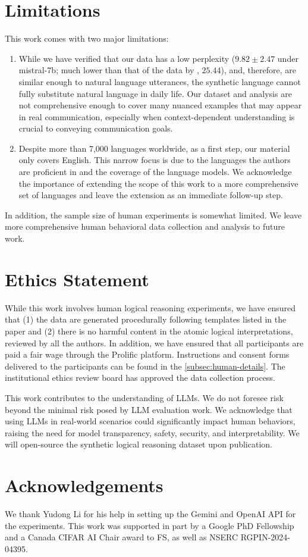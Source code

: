 \section*{Limitations}
This work comes with two major limitations:
\begin{enumerate}[leftmargin=*,topsep=0pt,itemsep=0pt]
      \item While we have verified that our data has a low perplexity ($9.82\pm 2.47$ under mistral-7b; much lower than that of the data by \citet{wanLogicAskerEvaluatingImproving2024}, $25.44$), and, therefore, are similar enough to natural language utterances, the synthetic language cannot fully substitute natural language in daily life.
            Our dataset and analysis are not comprehensive enough to cover many nuanced examples that may appear in real communication, especially when context-dependent understanding is crucial to conveying communication goals.
      \item Despite more than 7,000 languages worldwide, as a first step, our material only covers English.
            This narrow focus is due to the languages the authors are proficient in and the coverage of the language models.
            We acknowledge the importance of extending the scope of this work to a more comprehensive set of languages and leave the extension as an immediate follow-up step.
\end{enumerate}

In addition, the sample size of human experiments is somewhat limited.
We leave more comprehensive human behavioral data collection and analysis to future work.

\section*{Ethics Statement}

While this work involves human logical reasoning experiments, we have ensured that (1) the data are generated procedurally following templates listed in the paper and (2) there is no harmful content in the atomic logical interpretations, reviewed by all the authors.
In addition, we have ensured that all participants are paid a fair wage through the Prolific platform.
Instructions and consent forms delivered to the participants can be found in the \cref{subsec:human-details}.
The institutional ethics review board has approved the data collection process.

This work contributes to the understanding of LLMs.
We do not foresee risk beyond the minimal risk posed by LLM evaluation work.
We acknowledge that using LLMs in real-world scenarios could significantly impact human behaviors, raising the need for model transparency, safety, security, and interpretability.
We will open-source the synthetic logical reasoning dataset upon publication.

\section{Acknowledgements}
We thank Yudong Li for his help in setting up the Gemini and OpenAI API for the experiments.
This work was supported in part by a Google PhD Fellowship and a Canada CIFAR AI Chair award to FS, as well as NSERC RGPIN-2024-04395.
